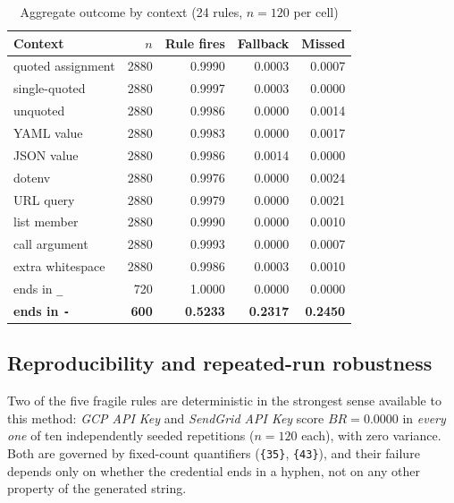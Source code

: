 \documentclass[journal]{IEEEtran}
\begin{document}
\begin{table}[t]
\centering
\caption{Aggregate outcome by context (24 rules, $n{=}120$ per cell)}
\label{tab:contexts}
\small
\begin{tabular}{@{}lrrrr@{}}
\toprule
Context & $n$ & Rule fires & Fallback & Missed \\
\midrule
quoted assignment & 2880 & 0.9990 & 0.0003 & 0.0007 \\
single-quoted & 2880 & 0.9997 & 0.0003 & 0.0000 \\
unquoted & 2880 & 0.9986 & 0.0000 & 0.0014 \\
YAML value & 2880 & 0.9983 & 0.0000 & 0.0017 \\
JSON value & 2880 & 0.9986 & 0.0014 & 0.0000 \\
dotenv & 2880 & 0.9976 & 0.0000 & 0.0024 \\
URL query & 2880 & 0.9979 & 0.0000 & 0.0021 \\
list member & 2880 & 0.9990 & 0.0000 & 0.0010 \\
call argument & 2880 & 0.9993 & 0.0000 & 0.0007 \\
extra whitespace & 2880 & 0.9986 & 0.0003 & 0.0010 \\
ends in \texttt{\_} & 720 & 1.0000 & 0.0000 & 0.0000 \\
\textbf{ends in \texttt{-}} & \textbf{600} & \textbf{0.5233} & \textbf{0.2317} & \textbf{0.2450} \\
\bottomrule
\end{tabular}
\end{table}

\subsection{Reproducibility and repeated-run robustness}
\label{sec:reprod-rq1}

Two of the five fragile rules are deterministic in the strongest sense available to this method: \emph{GCP API Key} and \emph{SendGrid API Key} score $BR=0.0000$ in \emph{every one} of ten independently seeded repetitions ($n=120$ each), with zero variance. Both are governed by fixed-count quantifiers (\texttt{\{35\}}, \texttt{\{43\}}), and their failure depends only on whether the credential ends in a hyphen, not on any other property of the generated string.
\end{document}
